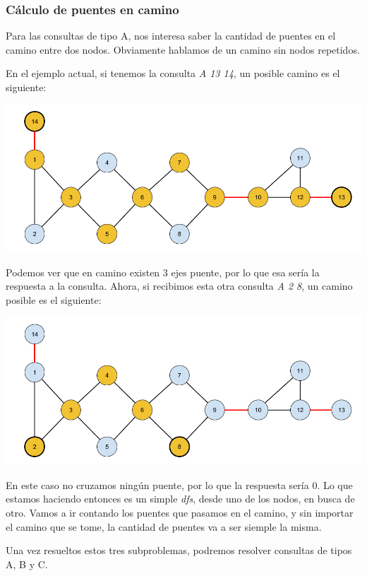 \subsubsection{Cálculo de puentes en camino}
Para las consultas de tipo A, nos interesa saber la cantidad de puentes en el camino entre dos nodos. Obviamente hablamos de un camino sin nodos repetidos. 

\noindent
En el ejemplo actual, si tenemos la consulta \textit{A 13 14}, un posible camino es el siguiente:

\includegraphics[scale=0.4]{Imagenes/Imagen5}

\hfill \break \noindent
Podemos ver que en camino existen 3 ejes puente, por lo que esa sería la respuesta a la consulta. Ahora, si recibimos esta otra consulta \textit{A 2 8}, un camino posible es el siguiente:

\includegraphics[scale=0.4]{Imagenes/Imagen6}

\noindent
En este caso no cruzamos ningún puente, por lo que la respuesta sería 0. Lo que estamos haciendo entonces es un simple \textit{dfs}, desde uno de los nodos, en busca de otro. Vamos a ir contando los puentes que pasamos en el camino, y sin importar el camino que se tome, la cantidad de puentes va a ser siemple la misma.

\hfill \break \noindent
Una vez resueltos estos tres subproblemas, podremos resolver consultas de tipos A, B y C.

